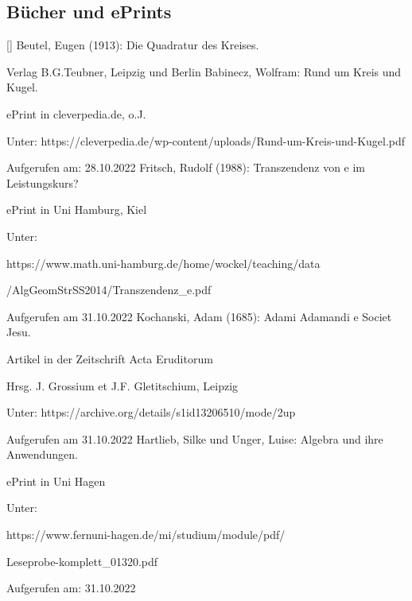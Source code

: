 \subsection{Bücher und ePrints}
[\EugenBeutelInt] Beutel, Eugen (1913): Die Quadratur des Kreises. \par Verlag B.G.Teubner, Leipzig und  Berlin \newline\newline[\BabineczInt] Babinecz, Wolfram: Rund um Kreis und Kugel. \par ePrint in cleverpedia.de, o.J. \par Unter: https://cleverpedia.de/wp-content/uploads/Rund-um-Kreis-und-Kugel.pdf \par Aufgerufen am: 28.10.2022 \newline\newline
[\FritschInt] Fritsch, Rudolf (1988): Transzendenz von e im Leistungskurs? \par ePrint in Uni Hamburg, Kiel \par Unter: \begin{simplechar}https://www.math.uni-hamburg.de/home/wockel/teaching/data\par 
 /AlgGeomStrSS2014/Transzendenz_e.pdf\end{simplechar} \par Aufgerufen am 31.10.2022 \newline\newline
[\ActaInt] Kochanski, Adam (1685): Adami Adamandi e Societ Jesu. \par Artikel in der Zeitschrift Acta Eruditorum\par Hrsg. J. Grossium et J.F. Gletitschium, Leipzig \par Unter: https://archive.org/details/s1id13206510/mode/2up \par Aufgerufen am 31.10.2022 \newline\newline
[\AlgebraInt] Hartlieb, Silke und Unger, Luise: Algebra und ihre Anwendungen. \par ePrint in Uni Hagen \par Unter: \begin{simplechar}
    https://www.fernuni-hagen.de/mi/studium/module/pdf/\par Leseprobe-komplett_01320.pdf
\end{simplechar}\par Aufgerufen am: 31.10.2022
\newline\newline
